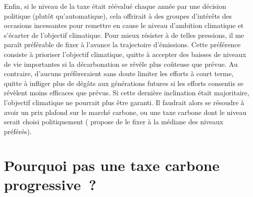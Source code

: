 \documentclass[a5paper,french]{memoir}
\begin{document}
Enfin, si le niveau de la taxe était réévalué chaque année par une décision politique (plutôt qu'automatique), cela offrirait à des groupes d'intérêts des occasions incessantes pour remettre en cause le niveau d'ambition climatique et s'écarter de l'objectif climatique. Pour mieux résister à de telles pressions, il me paraît préférable de fixer à l'avance la trajectoire d'émissions. Cette préférence consiste à prioriser l'objectif climatique, quitte à accepter des baisses de niveaux de vie importantes si la décarbonation se révèle plus coûteuse que prévue. 
Au contraire, d'aucuns préfèreraient sans doute limiter les efforts à court terme, quitte à infliger plus de dégâts aux générations futures si les efforts consentis se révèlent moins efficaces que prévus. Si cette dernière inclination était majoritaire, l'objectif climatique ne pourrait plus être garanti. Il faudrait alors se résoudre à avoir un prix plafond sur le marché carbone, ou une taxe carbone dont le niveau serait choisi politiquement (\cite{weitzman_world_2017} propose de le fixer à la médiane des niveaux préférés). 

\section*{\normalsize Pourquoi pas une taxe carbone progressive~?}\label{q:taxe_progressive}
\end{document}
